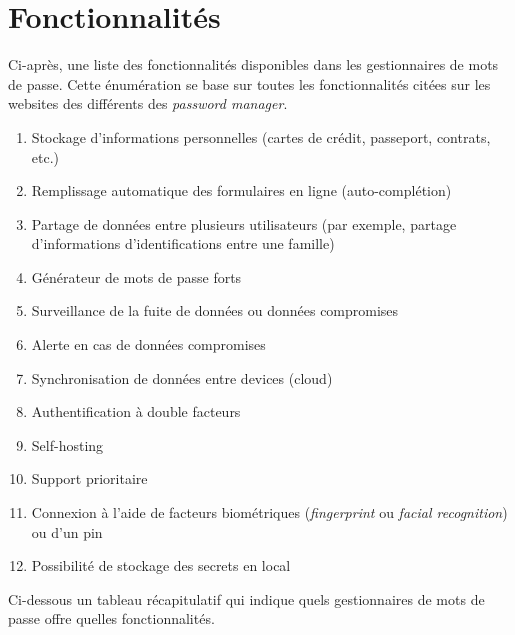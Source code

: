 \section{Fonctionnalités}
Ci-après, une liste des fonctionnalités disponibles dans les gestionnaires de mots de passe. Cette énumération se base sur toutes les fonctionnalités citées sur les websites des différents des \textit{password manager}. \\
\begin{enumerate}
	\item Stockage d'informations personnelles (cartes de crédit, passeport, contrats, etc.)
	\item Remplissage automatique des formulaires en ligne (auto-complétion)
	\item Partage de données entre plusieurs utilisateurs (par exemple, partage d'informations d'identifications entre une famille)
	\item Générateur de mots de passe forts
	\item Surveillance de la fuite de données ou données compromises
	\item Alerte en cas de données compromises
	\item Synchronisation de données entre devices (cloud)
	\item Authentification à double facteurs
	\item Self-hosting
	\item Support prioritaire
	\item Connexion à l'aide de facteurs biométriques (\textit{fingerprint} ou \textit{facial recognition}) ou d'un pin
	\item Possibilité de stockage des secrets en local
	
\end{enumerate}
Ci-dessous un tableau récapitulatif qui indique quels gestionnaires de mots de passe offre quelles fonctionnalités. 
